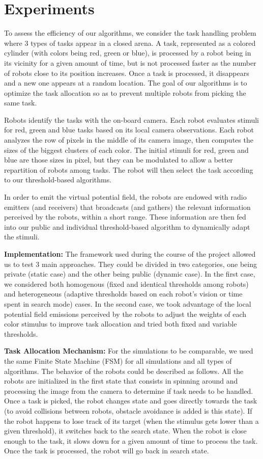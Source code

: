 \section{Experiments}
To assess the efficiency of our algorithms, we consider the task handling problem where 3 types of tasks appear in a closed arena. A task, represented as a colored cylinder (with colors being red, green or blue), is processed by a robot being in its vicinity for a given amount of time, but is not processed faster as the number of robots close to its position increases. Once a task is processed, it disappears and a new one appears at a random location. The goal of our algorithms is to optimize the task allocation so as to prevent multiple robots from picking the same task.

Robots identify the tasks with the on-board camera. Each robot evaluates stimuli for red, green and blue tasks based on its local camera observations. Each robot analyzes the row of pixels in the middle of its camera image, then computes the sizes of the biggest clusters of each color. The initial stimuli for red, green and blue are those sizes in pixel, but they can be modulated to allow a better repartition of robots among tasks. The  robot  will  then select the  task according to our threshold-based algorithms.

In order to emit the virtual potential field, the robots are endowed with radio emitters (and receivers) that broadcasts (and gathers) the relevant information perceived by the robots, within a short range. These information are then fed into our public and individual threshold-based algorithm to dynamically adapt the stimuli.

\textbf{Implementation:}
The framework used during the course of the project allowed us to test 3 main approaches. They could be divided in two categories, one being private (static case) and the other being public (dynamic case). In the first case, we considered both homogenous (fixed and identical thresholds among robots) and heterogeneous (adaptive thresholds based on each robot's vision or time spent in search mode) cases. In the second case, we took advantage of the local potential field emissions perceived by the robots to adjust the weights of each color stimulus to improve task allocation and tried both fixed and variable thresholds.

\textbf{Task Allocation Mechanism:}
For the simulations to be comparable, we used the same Finite State Machine (FSM) for all simulations and all types of algorithms. The behavior of the robots could be described as follows. All the robots are initialized in the first state that consists in spinning around and processing the image from the camera to determine if task needs to be handled. Once a task is picked, the robot changes state and goes directly towards the task (to avoid collisions between robots, obstacle avoidance is added is this state). If the robot happens to lose track of its target (when the stimulus gets lower than a given threshold), it switches back to the search state. When the robot is close enough to the task, it slows down for a given amount of time to process the task. Once the task is processed, the robot will go back in search state.

